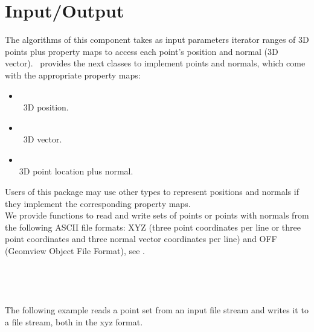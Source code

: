 \section{Input/Output}

The algorithms of this component takes as input parameters iterator ranges of 3D points plus property maps to access each point's position and normal (3D vector). \cgal\ provides the next classes to implement points and normals, which come with the appropriate property maps:

\begin{itemize}
\item {} \\
\cgal\ 3D position.
\item {} \\
\cgal\ 3D vector.
\item {} \\
3D point location plus normal.
\end{itemize}

Users of this package may use other types to represent positions and normals if they implement the corresponding property maps. \\

We provide functions to read and write sets of points or points with normals from the following ASCII file formats: XYZ (three point coordinates  per line or three point coordinates and three normal vector coordinates  per line) and OFF (Geomview Object File Format), see \cite{cgal-off-format}. %
\\
  \\
  \\
  \\
  \\

The following example reads a point set from an input file stream and writes it to a file stream, both in the xyz format.
